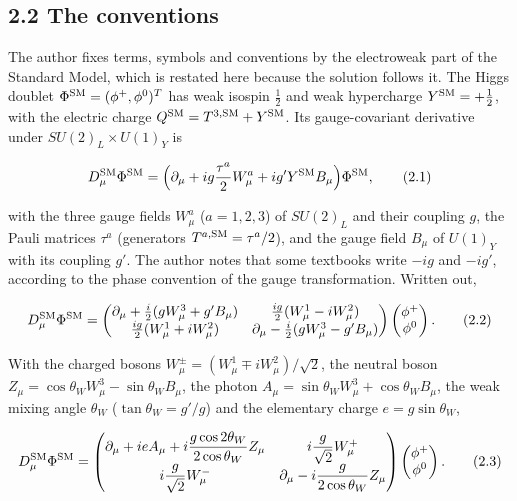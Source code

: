 \documentclass[
  10pt,
]{article}
\begin{document}
\hypertarget{the-conventions}{%
\subsection{2.2 The conventions}\label{the-conventions}}

The author fixes terms, symbols and conventions by the electroweak part
of the Standard Model, which is restated here because the solution
follows it. The Higgs doublet \(\Phi^{\rm SM}=(\phi^+,\phi^0)^T\) has
weak isospin \(\tfrac12\) and weak hypercharge \(Y^{\rm SM}=+\tfrac12\),
with the electric charge \(Q^{\rm SM}=T^{3,{\rm SM}}+Y^{\rm SM}\). Its
gauge-covariant derivative under \(SU(2)_L\times U(1)_Y\) is

\[D^{\rm SM}_\mu\Phi^{\rm SM}=\Big(\partial_\mu+ig\frac{\tau^a}2W^a_\mu+ig'Y^{\rm SM}B_\mu\Big)\Phi^{\rm SM},\tag{2.1}\]

with the three gauge fields \(W^a_\mu\) (\(a=1,2,3\)) of \(SU(2)_L\) and
their coupling \(g\), the Pauli matrices \(\tau^a\) (generators
\(T^{a,{\rm SM}}=\tau^a/2\)), and the gauge field \(B_\mu\) of
\(U(1)_Y\) with its coupling \(g'\). The author notes that some
textbooks write \(-ig\) and \(-ig'\), according to the phase convention
of the gauge transformation. Written out,

\[D^{\rm SM}_\mu\Phi^{\rm SM}=\begin{pmatrix}\partial_\mu+\tfrac i2(gW^3_\mu+g'B_\mu)&\tfrac{ig}2(W^1_\mu-iW^2_\mu)\\\tfrac{ig}2(W^1_\mu+iW^2_\mu)&\partial_\mu-\tfrac i2(gW^3_\mu-g'B_\mu)\end{pmatrix}\begin{pmatrix}\phi^+\\\phi^0\end{pmatrix}.\tag{2.2}\]

With the charged bosons \(W^\pm_\mu=(W^1_\mu\mp iW^2_\mu)/\sqrt2\), the
neutral boson \(Z_\mu=\cos\theta_WW^3_\mu-\sin\theta_WB_\mu\), the
photon \(A_\mu=\sin\theta_WW^3_\mu+\cos\theta_WB_\mu\), the weak mixing
angle \(\theta_W\) (\(\tan\theta_W=g'/g\)) and the elementary charge
\(e=g\sin\theta_W\),

\[D^{\rm SM}_\mu\Phi^{\rm SM}=\begin{pmatrix}\partial_\mu+ieA_\mu+i\dfrac{g\cos2\theta_W}{2\cos\theta_W}Z_\mu&i\dfrac g{\sqrt2}W^+_\mu\\i\dfrac g{\sqrt2}W^-_\mu&\partial_\mu-i\dfrac g{2\cos\theta_W}Z_\mu\end{pmatrix}\begin{pmatrix}\phi^+\\\phi^0\end{pmatrix}.\tag{2.3}\]
\end{document}
